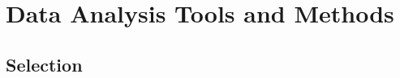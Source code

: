 
\chapter{Data Analysis Tools and Methods}
\label{sec:dataanalysis}

\section{Selection}
\label{sec:dataanalysis:selection}







